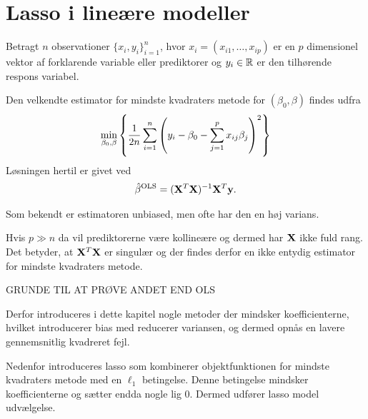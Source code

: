 \chapter{Lasso i lineære modeller}

Betragt \(n\) observationer \(\{x_i, y_i\}_{i=1}^n \), hvor $x_i=(x_{i1}, \ldots, x_{ip})$ er en $p$ dimensionel vektor af forklarende variable eller prediktorer og $y_i \in \mathbb{R}$ er den tilhørende respons variabel.



Den velkendte estimator for mindste kvadraters metode for $(\beta_0, \beta)$ findes udfra
\begin{align*}
\min_{\beta_0, \beta} \cbr{\frac{1}{2n} \sum_{i=1}^n \del{y_i - \beta_0 - \sum_{j=1}^p x_{ij} \beta_j}^2}
\end{align*}
Løsningen hertil er givet ved
\begin{align*}
\hat{\beta}^{\text{OLS}} = (\mathbf{X}^T \mathbf{X})^{-1} \mathbf{X}^T \mathbf{y}.
\end{align*}



Som bekendt er estimatoren unbiased, men ofte har den en høj varians.


Hvis \(p \gg n\) da vil prediktorerne være kollineære og dermed har \(\mathbf{X}\) ikke fuld rang.
Det betyder, at $\mathbf{X}^T \mathbf{X}$ er singulær og der findes derfor en ikke entydig estimator for mindste kvadraters metode.


GRUNDE TIL AT PRØVE ANDET END OLS


Derfor introduceres i dette kapitel nogle metoder der mindsker koefficienterne, hvilket introducerer bias med reducerer variansen, og dermed opnås en lavere gennemsnitlig kvadreret fejl.

Nedenfor introduceres lasso som kombinerer objektfunktionen for mindste kvadraters metode med en $\ell_1$ betingelse. Denne betingelse mindsker koefficienterne og sætter endda nogle lig 0. Dermed udfører lasso model udvælgelse.

